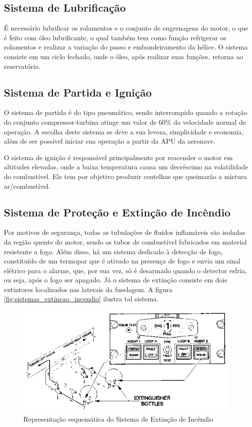 \subsection{Sistema de Lubrificação}

É necessário lubrificar os rolamentos e o conjunto de engrenagens do motor, o que é feito com óleo lubrificante, o qual também tem como função refrigerar os rolamentos e realizar a variação do passo e embandeiramento da hélice.
O sistema consiste em um ciclo fechado, onde o óleo, após realizar suas funções, retorna ao reservatório.

\subsection{Sistema de Partida e Ignição}

O sistema de partida é do tipo pneumático, sendo interrompido quando a rotação do conjunto compressor-turbina atinge um valor de 60\% da velocidade normal de operação.
A escolha deste sistema se deve a sua leveza, simplicidade e economia, além de ser possível iniciar sua operação a partir da APU da aeronave.

O sistema de ignição é responsável principalmente por reacender o motor em altitudes elevadas, onde a baixa temperatura causa um decréscimo na volatilidade do combustível.
Ele tem por objetivo produzir centelhas que queimarão a mistura ar/combustível.

\subsection{Sistema de Proteção e Extinção de Incêndio}

Por motivos de segurança, todas as tubulações de fluidos inflamáveis são isoladas da região quente do motor, sendo os tubos de combustível fabricados em material resistente a fogo.
Além disso, há um sistema dedicado à detecção de fogo, constituído de um termopar que é ativado na presença de fogo e envia um sinal elétrico para o alarme, que, por sua vez, só é desarmado quando o detector esfria, ou seja, após o fogo ser apagado.
Já o sistema de extinção consiste em dois extintores localizados nas laterais da fuselagem. A figura \autoref{fig:sistemas_extincao_incendio} ilustra tal sistema.

\begin{figure}
\centering
\includegraphics[width=\textwidth]{images/parte3/sistemas_extincao_incendio.png}
\caption{Representação esquemática do Sistema de Extinção de Incêndio}
\label{fig:sistemas_extincao_incendio}
\end{figure}


